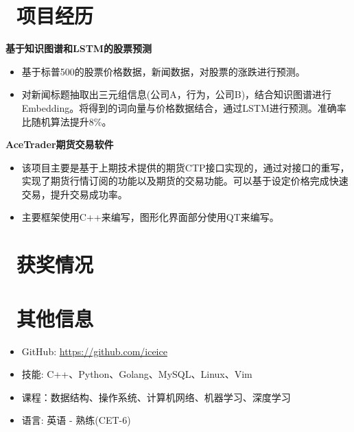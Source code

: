\documentclass{resume}
\begin{document}
\section{\faArchive \ 项目经历}
\begin{onehalfspacing}
\textbf{基于知识图谱和LSTM的股票预测}
\begin{itemize}
  \item 基于标普500的股票价格数据，新闻数据，对股票的涨跌进行预测。
  \item 对新闻标题抽取出三元组信息(公司A，行为，公司B)，结合知识图谱进行Embedding。将得到的词向量与价格数据结合，通过LSTM进行预测。准确率比随机算法提升8\%。
\end{itemize}
\textbf{AceTrader期货交易软件}
\begin{itemize}
  \item 该项目主要是基于上期技术提供的期货CTP接口实现的，通过对接口的重写，实现了期货行情订阅的功能以及期货的交易功能。可以基于设定价格完成快速交易，提升交易成功率。
  \item 主要框架使用C++来编写，图形化界面部分使用QT来编写。
\end{itemize}
\end{onehalfspacing}

\section{\ 获奖情况}
\begin{onehalfspacing}
\end{onehalfspacing}

\section{\ 其他信息}
\begin{itemize}[parsep=0.5ex]
  \item GitHub: \href{https://github.com/iceice}{https://github.com/iceice}
  \item 技能: C++、Python、Golang、MySQL、Linux、Vim
  \item 课程：数据结构、操作系统、计算机网络、机器学习、深度学习
  \item 语言: 英语 - 熟练(CET-6)
\end{itemize}

%
%
\end{document}
